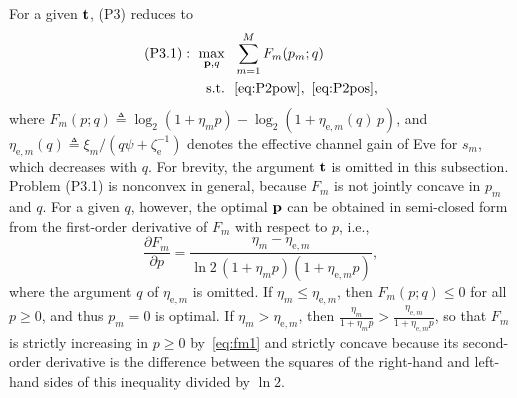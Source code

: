 \documentclass[journal]{IEEEtran}
\begin{document}
For a given $\mathbf{t}$, (P3) reduces to
\begin{subequations}\label{eq:P31}
\begin{align}
(\mathrm{P3.1}):\ \max_{\mathbf{p},q}\ \ & \sum_{m=1}^{M}F_m(p_m;q)\\
\mathrm{s.t.}\ \ & \eqref{eq:P2pow},\ \eqref{eq:P2pos},\nonumber
\end{align}
\end{subequations}
where $F_m(p;q)\triangleq\log_2(1+\eta_mp)-\log_2(1+\eta_{\mathrm{e},m}(q)\,p)$, and $\eta_{\mathrm{e},m}(q)\triangleq\xi_m/(q\psi+\zeta_{\mathrm e}^{-1})$ denotes the effective channel gain of Eve for $s_m$, which decreases with $q$. For brevity, the argument $\mathbf{t}$ is omitted in this subsection. Problem (P3.1) is nonconvex in general, because $F_m$ is not jointly concave in $p_m$ and $q$. For a given $q$, however, the optimal $\mathbf{p}$ can be obtained in semi-closed form from the first-order derivative of $F_m$ with respect to $p$, i.e.,
\begin{equation}\label{eq:fm1}
\frac{\partial F_m}{\partial p}=\frac{\eta_m-\eta_{\mathrm{e},m}}{\ln2\,(1+\eta_mp)(1+\eta_{\mathrm{e},m}p)},
\end{equation}
where the argument $q$ of $\eta_{\mathrm{e},m}$ is omitted. If $\eta_m\le\eta_{\mathrm{e},m}$, then $F_m(p;q)\le0$ for all $p\ge0$, and thus $p_m=0$ is optimal. If $\eta_m>\eta_{\mathrm{e},m}$, then $\frac{\eta_m}{1+\eta_mp}>\frac{\eta_{\mathrm{e},m}}{1+\eta_{\mathrm{e},m}p}$, so that $F_m$ is strictly increasing in $p\ge0$ by~\eqref{eq:fm1} and strictly concave because its second-order derivative is the difference between the squares of the right-hand and left-hand sides of this inequality divided by $\ln2$.
\end{document}
